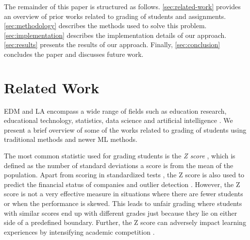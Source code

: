 \documentclass[conference]{IEEEtran}
\begin{document}
The remainder of this paper is structured as follows. \autoref{sec:related-work}
provides an overview of prior works related to grading of students and
assignments. \autoref{sec:methodology} describes the methods used to solve this
problem. \autoref{sec:implementation} describes the implementation details of
our approach. \autoref{sec:results} presents the results of our approach.
Finally, \autoref{sec:conclusion} concludes the paper and discusses future work.

\section{Related Work}
\label{sec:related-work}

EDM and LA encompass a wide range of fields such as education research,
educational technology, statistics, data science and artificial intelligence
\cite{WhatLearningAnalytics}. We present a brief overview of some of the works
related to grading of students using traditional methods and newer ML methods.

The most common statistic used for grading students is the \emph{Z score}
\cite{spiegelSchaumsOutlineStatistics2018}, which is defined as the number of
standard deviations a score is from the mean of the population. Apart from
scoring in standardized tests
\cite{santhanakrishnanParallelDistributedCluster2022}, the Z score is also used
to predict the financial status of companies
\cite{jagannathanPredictingBankruptcyCompanies2023} and outlier detection
\cite{yaroOutlierDetectionPerformance2024,aggarwalDetectionSpatialOutlier2019}.
However, the Z score is not a very effective measure in situations where there
are fewer students or when the performance is skewed. This leads to unfair
grading where students with similar scores end up with different grades just
because they lie on either side of a predefined boundary. Further, the Z score
can adversely impact learning experiences by intensifying academic competition
\cite{kleinAssessingUniversityStudents2014a}.
\end{document}
